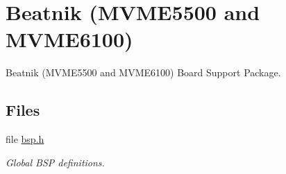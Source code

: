 \hypertarget{group__RTEMSBSPsPowerPCBeatnik}{}\section{Beatnik (M\+V\+M\+E5500 and M\+V\+M\+E6100)}
\label{group__RTEMSBSPsPowerPCBeatnik}


Beatnik (M\+V\+M\+E5500 and M\+V\+M\+E6100) Board Support Package.  


\subsection*{Files}
\begin{DoxyCompactItemize}
\item 
file \mbox{\hyperlink{bsps_2powerpc_2beatnik_2include_2bsp_8h}{bsp.\+h}}
\begin{DoxyCompactList}\small\item\em Global B\+SP definitions. \end{DoxyCompactList}\end{DoxyCompactItemize}
